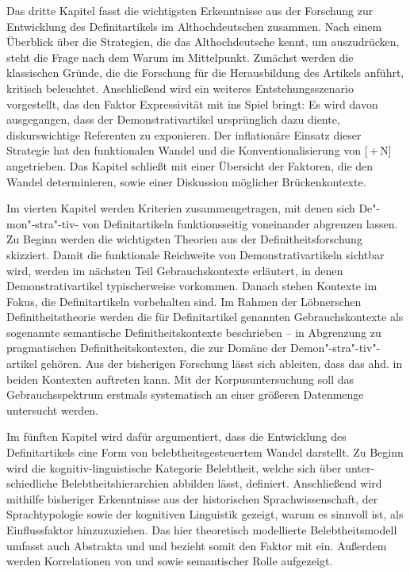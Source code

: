 Das dritte Kapitel fasst die wichtigsten Erkenntnisse aus der Forschung zur Entwicklung des Definitartikels  im Althochdeutschen zusammen. Nach einem Überblick über die Strategien, die das Althochdeutsche kennt, um  auszudrücken, steht die Frage nach dem Warum im Mittelpunkt. Zunächst werden die klassischen Gründe, die die Forschung für die Herausbildung des Artikels anführt, kritisch beleuchtet. Anschließend wird ein weiteres Entstehungsszenario vorgestellt, das den Faktor Expressivität mit ins Spiel bringt: Es wird davon ausgegangen, dass der Demonstrativartikel  ursprünglich dazu diente, diskurswichtige Referenten zu exponieren. Der inflationäre Einsatz dieser Strategie hat den funktionalen Wandel und die Konventionalisierung von [\,+\,N] angetrieben. Das Kapitel schließt mit einer Übersicht der Faktoren, die den Wandel determinieren, sowie einer Diskussion möglicher Brückenkontexte. 

Im vierten Kapitel werden Kriterien zusammengetragen, mit denen sich De"-mon"-stra"-tiv- von Definitartikeln funktionsseitig voneinander abgrenzen lassen. Zu Beginn werden die wichtigsten Theorien aus der Definitheitsforschung  skizziert. Damit die funktionale Reichweite von Demonstrativartikeln  sichtbar wird, werden im nächsten Teil Gebrauchskontexte erläutert, in denen Demonstrativ\-artikel typischerweise vorkommen. Danach stehen Kontexte im Fokus, die  Definitartikeln vorbehalten sind. 
Im Rahmen der Löbnerschen Definitheitstheorie \parencite{Lobner1985}  werden die für Definitartikel genannten Gebrauchskontexte als sogenannte semantische Definitheitskontexte beschrieben -- in Abgrenzung zu  pragmatischen Definitheitskontexten, die zur Domäne der Demon"-stra"-tiv"-artikel gehören. Aus der bisherigen Forschung lässt sich ableiten, dass das ahd.  in beiden Kontexten auftreten kann. Mit der Korpusuntersuchung  soll das Gebrauchsspektrum erstmals systematisch an einer größeren Datenmenge untersucht werden. 

Im fünften Kapitel wird dafür argumentiert, dass die Entwicklung des Definitartikels  eine Form von belebtheitsgesteuertem Wandel darstellt. Zu Beginn wird die kognitiv-linguistische Kategorie Belebtheit, welche sich über unter-\linebreak schiedliche Belebtheitshierarchien abbilden lässt, definiert. Anschließend wird mithilfe bisheriger Erkenntnisse aus der historischen Sprachwissenschaft, der Sprachtypologie sowie der kognitiven Linguistik gezeigt, warum es sinnvoll ist,  als Einflussfaktor hinzuzuziehen. Das hier theoretisch modellierte Belebtheitsmodell umfasst auch Abstrakta 
und  und bezieht somit den Faktor  mit ein. Außerdem werden Korrelationen von  und  sowie semantischer Rolle  aufgezeigt.

